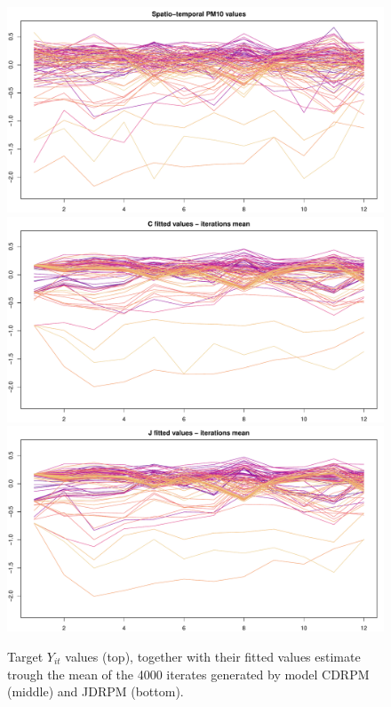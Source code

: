 \documentclass[12pt,	%
	a4paper,		%
	twoside,		%
	openright,		%
	titlepage,%
	]{book}
\theoremstyle{definition}
\begin{document}
\begin{figure}[!p]
    \centering
    \includegraphics[width=0.97\linewidth]{Testing//Assessing correctness//space/test_2_spatial_data.pdf}
    \includegraphics[width=0.97\linewidth]{Testing//Assessing correctness//space/C_mean_prediction.pdf}
    \includegraphics[width=0.97\linewidth]{Testing//Assessing correctness//space/J_mean_prediction.pdf}
    \caption[Target and fitted values of JDRPM and CDRPM fits, target plus space values]{Target $Y_{it}$ values (top), together with their fitted values estimate trough the mean of the 4000 iterates generated by model CDRPM (middle) and JDRPM (bottom).}
    \label{fig: fitted and target values space}
\end{figure}
\end{document}
